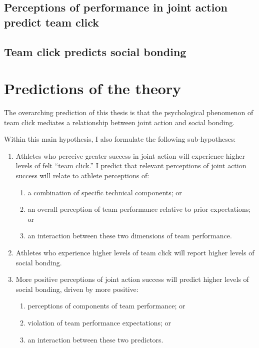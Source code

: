\begin{CJK}{UTF8}{gbsn}
    \subsection{Perceptions of performance in joint action predict team click}


    \subsection{Team click predicts social bonding}











\section{Predictions of the theory}


    The overarching prediction of this thesis is that the psychological phenomenon of team click mediates a relationship between joint action and social bonding.

    Within this main hypothesis, I also formulate the following sub-hypotheses:
    \begin{enumerate}
      \item Athletes who perceive greater success in joint action will experience higher levels of felt ``team click.'' I predict that relevant perceptions of joint action success will relate to athlete perceptions of:
        \begin{enumerate}
          \item a combination of specific technical components; or
          \item an overall perception of team performance relative to prior expectations; or
          \item an interaction between these two dimensions of team performance.
        \end{enumerate}
      \item Athletes who experience higher levels of team click will report higher levels of social bonding.
      \item More positive perceptions of joint action success will predict higher levels of social bonding, driven by more positive:
      \begin{enumerate}
        \item perceptions of components of team performance; or
        \item violation of team performance expectations; or
        \item an interaction between these two predictors.
      \end{enumerate}
    \end{enumerate}


\end{CJK}
